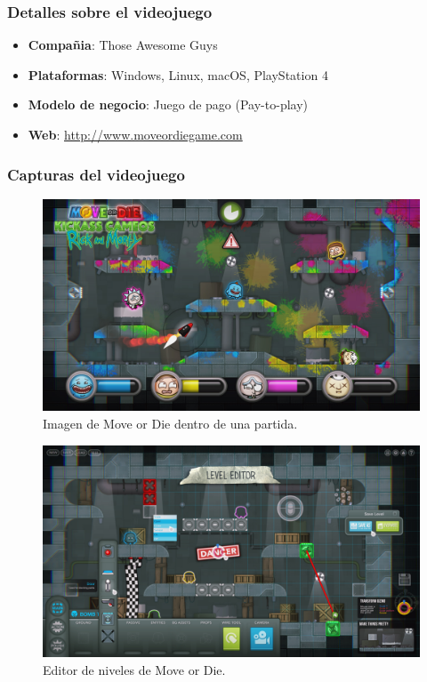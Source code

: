 \documentclass[12pt, spanish]{article}
\begin{document}
\subsubsection{Detalles sobre el videojuego}

\begin{itemize}
	\item \textbf{Compañia}: Those Awesome Guys
	\item \textbf{Plataformas}: Windows, Linux, macOS, PlayStation 4
	\item \textbf{Modelo de negocio}: Juego de pago (Pay-to-play)
	\item \textbf{Web}: \url{http://www.moveordiegame.com}
\end{itemize}

\subsubsection{Capturas del videojuego}

\begin{figure}[H]
  \centering
   \includegraphics[width=\textwidth]{"competencia/mod_juego.jpg"}
	\caption{Imagen de Move or Die dentro de una partida.}
\end{figure}

\begin{figure}[H]
  \centering
   \includegraphics[width=\textwidth]{"competencia/mod_editor.jpg"}
	\caption{Editor de niveles de Move or Die.}
\end{figure}
\end{document}
